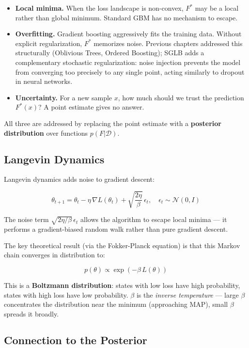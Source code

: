 \documentclass[11pt, a4paper]{article}
\begin{document}
\begin{itemize}
  \item \textbf{Local minima.} When the loss landscape is non-convex,
    $F^*$ may be a local rather than global minimum. Standard GBM has no
    mechanism to escape.
  \item \textbf{Overfitting.} Gradient boosting aggressively fits the
    training data. Without explicit regularization, $F^*$ memorizes noise.
    Previous chapters addressed this structurally (Oblivious Trees,
    Ordered Boosting); SGLB adds a complementary stochastic regularization:
    noise injection prevents the model from converging too precisely to
    any single point, acting similarly to dropout in neural networks.
  \item \textbf{Uncertainty.} For a new sample $x$, how much should we
    trust the prediction $F^*(x)$? A point estimate gives no answer.
\end{itemize}

All three are addressed by replacing the point estimate with a
\textbf{posterior distribution} over functions $p(F|\mathcal{D})$.

\subsection{Langevin Dynamics}

Langevin dynamics adds noise to gradient descent:

\[
\theta_{t+1} = \theta_t - \eta\,\nabla L(\theta_t) + \sqrt{\frac{2\eta}{\beta}}\,\epsilon_t,
\quad \epsilon_t \sim \mathcal{N}(0, I)
\]

The noise term $\sqrt{2\eta/\beta}\,\epsilon_t$ allows the algorithm to
escape local minima --- it performs a gradient-biased random walk rather
than pure gradient descent.

The key theoretical result (via the Fokker-Planck equation) is that
this Markov chain converges in distribution to:

\[
p(\theta) \propto \exp(-\beta\,L(\theta))
\]

This is a \textbf{Boltzmann distribution}: states with low loss have
high probability, states with high loss have low probability.
$\beta$ is the \emph{inverse temperature} --- large $\beta$ concentrates
the distribution near the minimum (approaching MAP), small $\beta$ spreads
it broadly.

\subsection{Connection to the Posterior}
\end{document}
